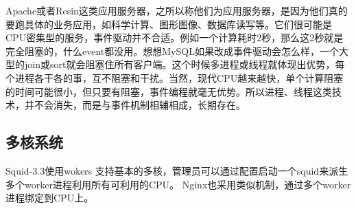 Apache或者Resin这类应用服务器，之所以称他们为应用服务器，是因为他们真的要跑具体的业务应用，如科学计算、图形图像、数据库读写等。它们很可能是CPU密集型的服务，事件驱动并不合适。例如一个计算耗时2秒，那么这2秒就是完全阻塞的，什么event都没用。想想MySQL如果改成事件驱动会怎么样，一个大型的join或sort就会阻塞住所有客户端。这个时候多进程或线程就体现出优势，每个进程各干各的事，互不阻塞和干扰。当然，现代CPU越来越快，单个计算阻塞的时间可能很小，但只要有阻塞，事件编程就毫无优势。所以进程、线程这类技术，并不会消失，而是与事件机制相辅相成，长期存在。

\subsection{多核系统}

Squid-3.3使用wokers 支持基本的多核，管理员可以通过配置启动一个squid来派生多个worker进程利用所有可利用的CPU。
Nginx也采用类似机制，通过多个worker进程绑定到CPU上。























